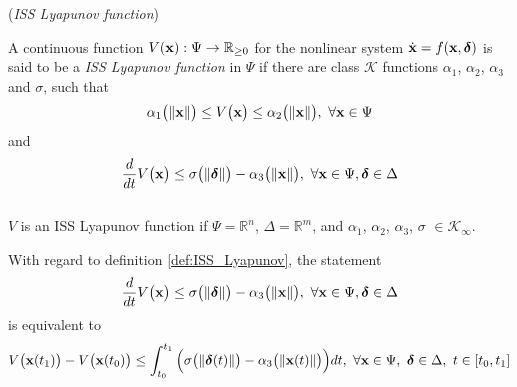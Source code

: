 \begin{definition}\cite{marquez2003nonlinear} (\textit{ISS Lyapunov function})
\label{def:ISS_Lyapunov}

A continuous function $V(\bm{\mathbf{x}}) : \Psi \to \mathbb{R}_{\geq 0}$ for the
nonlinear system $\dot{\bm{\mathbf{x}}} = f(\bm{\mathbf{x}}, \bm{\mathbf{\delta}})$ is said to be a
\textit{ISS Lyapunov function} in $\Psi$ if there are class
$\mathcal{K}$ functions
$\alpha_1$, $\alpha_2$, $\alpha_3$ and $\sigma$, such that
\begin{align}
  \alpha_1\big(\|\bm{\mathbf{x}}\|\big) \leq V\big(\bm{\mathbf{x}}\big) \leq \alpha_2\big(\|\bm{\mathbf{x}}\|\big),\ \forall \bm{\mathbf{x}} \in \Psi
\end{align}
and
\begin{align}
  \dfrac{d}{dt}V\big(\bm{\mathbf{x}}\big)
    \leq \sigma\big(\|\bm{\mathbf{\delta}}\|\big) - \alpha_3\big(\|\bm{\mathbf{x}}\|\big),\ \forall \bm{\mathbf{x}} \in \Psi, \bm{\mathbf{\delta}} \in \Delta
\end{align}
\\[2.5ex]
$V$ is an ISS Lyapunov function if $\Psi = \mathbb{R}^n$, $\Delta = \mathbb{R}^m$,
and $\alpha_1$, $\alpha_2$, $\alpha_3$, $\sigma$ $\in \mathcal{K}_{\infty}$.
\end{definition}


\newpage
\begin{remark}
\label{remark:ISS_Lyapunov}

With regard to definition \eqref{def:ISS_Lyapunov}, the statement
\begin{align}
  \dfrac{d}{dt}V\big(\bm{\mathbf{x}}\big)
    \leq \sigma\big(\|\bm{\mathbf{\delta}}\|\big) - \alpha_3\big(\|\bm{\mathbf{x}}\|\big),\ \forall \bm{\mathbf{x}} \in \Psi, \bm{\mathbf{\delta}} \in \Delta
\end{align}
is equivalent to
\begin{align}
  V\big(\bm{\mathbf{x}}(t_1)\big) - V\big(\bm{\mathbf{x}}(t_0)\big)
  \leq \int_{t_0}^{t_1}\Big(\sigma\big(\|\bm{\mathbf{\delta}}(t)\|\big) - \alpha_3\big(\|\bm{\mathbf{x}}(t)\|\big)\Big)dt,\
    \forall \bm{\mathbf{x}} \in \Psi,\ \bm{\mathbf{\delta}} \in \Delta,\ t \in [t_0, t_1]
\end{align}
\\[2.5ex]
\end{remark}


